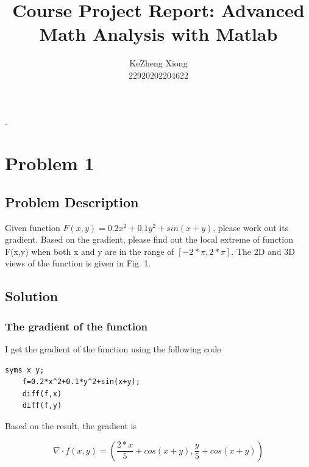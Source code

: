 \documentclass[12pt]{article}
\begin{document}
\title{Course Project Report: Advanced Math Analysis with Matlab}
\author{KeZheng Xiong \\ 22920202204622}

\maketitle

.

\tableofcontents

\pagebreak

\section{Problem 1}

\subsection{Problem Description}
Given function $F(x, y) = 0.2x^2 + 0.1y^2 + sin(x + y)$, please work out its
gradient. Based on the gradient, please find out the local extreme of function F(x,y)
when both x and y are in the range of $[-2*\pi, 2*\pi]$. The 2D and 3D views of the function
is given in Fig. 1. 

\subsection{Solution}

\subsubsection{The gradient of the function}

I get the gradient of the function using the following code

\begin{lstlisting}[style=MatlabStyle,caption=Gradient Calculation]
	syms x y;
	f=0.2*x^2+0.1*y^2+sin(x+y);
	diff(f,x)
	diff(f,y)
\end{lstlisting}

Based on the result, the gradient is

\begin{equation}
	\nabla \cdot f(x,y)=( \frac{2*x}{5} + cos(x + y), \frac{y}{5} + cos(x + y))
\end{equation}
\end{document}
